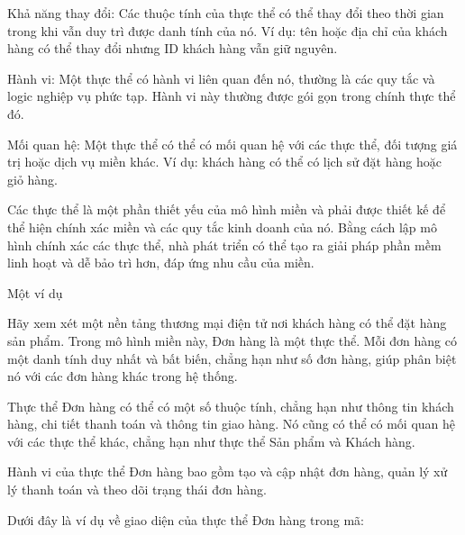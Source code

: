 Khả năng thay đổi: Các thuộc tính của thực thể có thể thay đổi theo thời gian trong khi vẫn duy trì được danh tính của nó. Ví dụ: tên hoặc địa chỉ của khách hàng có thể thay đổi nhưng ID khách hàng vẫn giữ nguyên.

Hành vi: Một thực thể có hành vi liên quan đến nó, thường là các quy tắc và logic nghiệp vụ phức tạp. Hành vi này thường được gói gọn trong chính thực thể đó.

Mối quan hệ: Một thực thể có thể có mối quan hệ với các thực thể, đối tượng giá trị hoặc dịch vụ miền khác. Ví dụ: khách hàng có thể có lịch sử đặt hàng hoặc giỏ hàng.

Các thực thể là một phần thiết yếu của mô hình miền và phải được thiết kế để thể hiện chính xác miền và các quy tắc kinh doanh của nó. Bằng cách lập mô hình chính xác các thực thể, nhà phát triển có thể tạo ra giải pháp phần mềm linh hoạt và dễ bảo trì hơn, đáp ứng nhu cầu của miền.

Một ví dụ

Hãy xem xét một nền tảng thương mại điện tử nơi khách hàng có thể đặt hàng sản phẩm. Trong mô hình miền này, Đơn hàng là một thực thể. Mỗi đơn hàng có một danh tính duy nhất và bất biến, chẳng hạn như số đơn hàng, giúp phân biệt nó với các đơn hàng khác trong hệ thống.

Thực thể Đơn hàng có thể có một số thuộc tính, chẳng hạn như thông tin khách hàng, chi tiết thanh toán và thông tin giao hàng. Nó cũng có thể có mối quan hệ với các thực thể khác, chẳng hạn như thực thể Sản phẩm và Khách hàng.

Hành vi của thực thể Đơn hàng bao gồm tạo và cập nhật đơn hàng, quản lý xử lý thanh toán và theo dõi trạng thái đơn hàng.

Dưới đây là ví dụ về giao diện của thực thể Đơn hàng trong mã:


